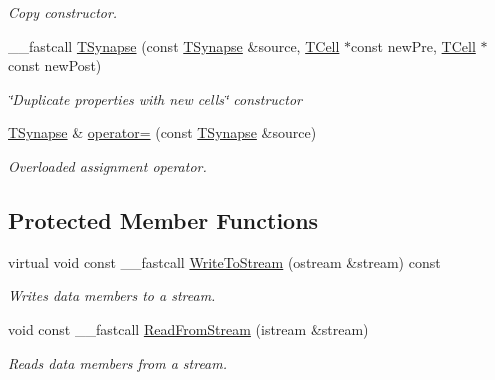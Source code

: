 \begin{DoxyCompactItemize}
\begin{DoxyCompactList}\small\item\em Copy constructor. \end{DoxyCompactList}\item 
\hypertarget{class_t_synapse_ac7cb27613f7da581c8114991693d544f}{\+\_\+\+\_\+fastcall \hyperlink{class_t_synapse_ac7cb27613f7da581c8114991693d544f}{T\+Synapse} (const \hyperlink{class_t_synapse}{T\+Synapse} \&source, \hyperlink{class_t_cell}{T\+Cell} $\ast$const new\+Pre, \hyperlink{class_t_cell}{T\+Cell} $\ast$const new\+Post)}\label{class_t_synapse_ac7cb27613f7da581c8114991693d544f}

\begin{DoxyCompactList}\small\item\em \char`\"{}\+Duplicate properties with new cells\char`\"{} constructor \end{DoxyCompactList}\item 
\hypertarget{class_t_synapse_a577120f6def957422905ca775f346c0d}{\hyperlink{class_t_synapse}{T\+Synapse} \& \hyperlink{class_t_synapse_a577120f6def957422905ca775f346c0d}{operator=} (const \hyperlink{class_t_synapse}{T\+Synapse} \&source)}\label{class_t_synapse_a577120f6def957422905ca775f346c0d}

\begin{DoxyCompactList}\small\item\em Overloaded assignment operator. \end{DoxyCompactList}\end{DoxyCompactItemize}
\subsection*{Protected Member Functions}
\begin{DoxyCompactItemize}
\item 
\hypertarget{class_t_synapse_a9547ed117272632e891c08c5329a9734}{virtual void const \+\_\+\+\_\+fastcall \hyperlink{class_t_synapse_a9547ed117272632e891c08c5329a9734}{Write\+To\+Stream} (ostream \&stream) const }\label{class_t_synapse_a9547ed117272632e891c08c5329a9734}

\begin{DoxyCompactList}\small\item\em Writes data members to a stream. \end{DoxyCompactList}\item 
\hypertarget{class_t_synapse_a5a7e20bb7ca2beba9c114ff6ae5495f6}{void const \+\_\+\+\_\+fastcall \hyperlink{class_t_synapse_a5a7e20bb7ca2beba9c114ff6ae5495f6}{Read\+From\+Stream} (istream \&stream)}\label{class_t_synapse_a5a7e20bb7ca2beba9c114ff6ae5495f6}

\begin{DoxyCompactList}\small\item\em Reads data members from a stream. \end{DoxyCompactList}\end{DoxyCompactItemize}
